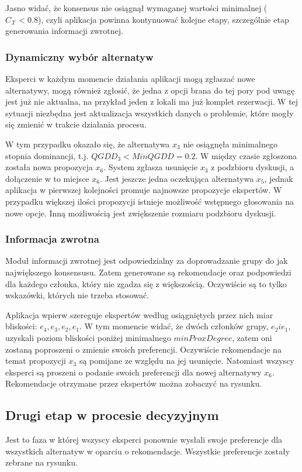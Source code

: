 Jasno widać, że konsensus nie osiągnął wymaganej wartości minimalnej
($C_{\mathcal{X}} < 0.8$), czyli aplikacja powinna kontynuować kolejne etapy,
szczególnie etap generowania informacji zwrotnej.

\subsubsection{Dynamiczny wybór alternatyw}
Eksperci w każdym momencie działania aplikacji mogą zgłaszać nowe alternatywy,
mogą również zgłosić, że jedna z opcji brana do tej pory pod uwagę jest już nie
aktualna, na przykład jeden z lokali ma już komplet rezerwacji.
W tej sytuacji niezbędna jest aktualizacja wszystkich danych o problemie, które
mogły się zmienić w trakcie działania procesu.

W tym przypadku okazało się, że alternatywa $x_3$ nie osiągnęła minimalnego
stopnia dominancji, t.j. $QGDD_3 < MinQGDD = 0.2$. W między czasie zgłoszona
została nowa propozycja $x_6$. System zgłasza usunięcie $x_3$ z
podzbioru dyskusji, a dołączenie w to miejsce $x_6$. Jest jeszcze jedna
oczekująca alternatywa $x_5$, jednak aplikacja w pierwszej kolejności promuje
najnowsze propozycje ekspertów. W przypadku większej ilości propozycji istnieje
możliwość wstępnego głosowania na nowe opcje. Inną możliwością jest zwiększenie
rozmiaru podzbioru dyskusji.

\subsubsection{Informacja zwrotna}
Moduł informacji zwrotnej jest odpowiedzialny za doprowadzanie grupy do jak
największego konsensusu. Zatem generowane są rekomendacje oraz podpowiedzi dla
każdego członka, który nie zgadza się z większością. Oczywiście są to tylko wskazówki,
których nie trzeba stosować.

Aplikacja wpierw szereguje ekspertów według osiągniętych przez nich miar
bliskości: $e_4, e_3, e_2, e_1$. W tym momencie widać, że dwóch członków grupy,
$e_2 i e_1$, uzyskali poziom bliskości poniżej minimalnego $minProxDegree$,
zatem oni zostaną poproszeni o zmienie swoich preferencji. Oczywiście
rekomendacje na temat propozycji $x_3$ są pomijane ze względu na jej usunięcie.
Natomiast wszyscy eksperci są proszeni o podanie swoich preferencji dla nowej
alternatywy $x_6$. Rekomendacje otrzymane przez ekspertów można zobaczyć na
rysunku. 

\subsection{Drugi etap w procesie decyzyjnym}
Jest to faza w której wszyscy eksperci ponownie wysłali swoje preferencje dla
wszystkich alternatyw w oparciu o rekomendacje. Wszystkie preferencje zostały
zebrane na rysunku. 

